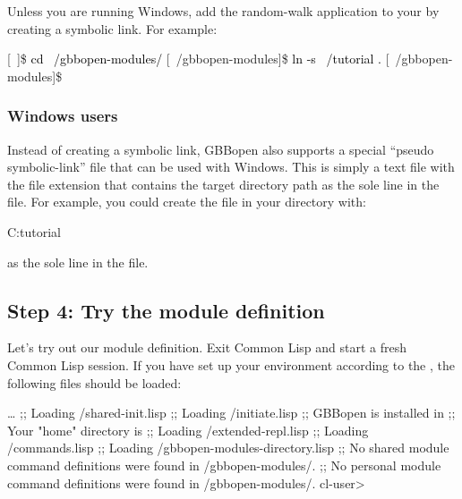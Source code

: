 \documentclass[10pt,twoside,english,pdftex]{article}
\begin{document}
Unless you are running Windows, add the random-walk application to your
 by creating a symbolic link.  For example:
%
\W\supp
\begin{example}
\textcolor{darkergray}{%
  [~]\$ \textcolor{black}{cd ~/gbbopen-modules/}
  [~/gbbopen-modules]\$ \textcolor{black}{ln -s ~/tutorial .}
  [~/gbbopen-modules]\$}
\end{example}

\subsubsection*{Windows users}

Instead of creating a symbolic link, GBBopen also supports a special ``pseudo
symbolic-link'' file that can be used with Windows.  This is simply a text
file with the file extension  that contains the target directory
path as the sole line in the file.  For example, you could create the file
 in your  directory
with:
%
\W\supp
\begin{example}
  C:\bkslash{}tutorial\bkslash
\end{example}
\T\vskip -12pt
%
as the sole line in the file.

\subsection*{Step 4: Try the  module definition}

Let's try out our module definition.  Exit Common Lisp and start a fresh
Common Lisp session.  If you have set up your environment according to the
,
the following files should be loaded:
%
\W\supp
\begin{smallexample}
\textcolor{darkergray}{%
     \textrm{\ldots{}}
  ;; Loading /shared-init.lisp
  ;;   Loading /initiate.lisp
  ;; GBBopen is installed in 
  ;; Your "home" directory is 
  ;;     Loading /extended-repl.lisp
  ;;     Loading /commands.lisp
  ;;     Loading /gbbopen-modules-directory.lisp
  ;; No shared module command definitions were found in /gbbopen-modules/.
  ;; No personal module command definitions were found in /gbbopen-modules/.
 cl-user>}
\end{smallexample}
\end{document}
